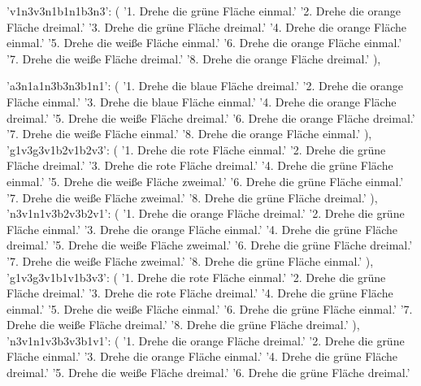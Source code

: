 {{        'v1n3v3n1b1n1b3n3': (
            '1. Drehe die grüne Fläche einmal.\n'
            '2. Drehe die orange Fläche dreimal.\n'
            '3. Drehe die grüne Fläche dreimal.\n'
            '4. Drehe die orange Fläche einmal.\n'
            '5. Drehe die weiße Fläche einmal.\n'
            '6. Drehe die orange Fläche einmal.\n'
            '7. Drehe die weiße Fläche dreimal.\n'
            '8. Drehe die orange Fläche dreimal.'
        ),

        'a3n1a1n3b3n3b1n1': (
            '1. Drehe die blaue Fläche dreimal.\n'
            '2. Drehe die orange Fläche einmal.\n'
            '3. Drehe die blaue Fläche einmal.\n'
            '4. Drehe die orange Fläche dreimal.\n'
            '5. Drehe die weiße Fläche dreimal.\n'
            '6. Drehe die orange Fläche dreimal.\n'
            '7. Drehe die weiße Fläche einmal.\n'
            '8. Drehe die orange Fläche einmal.'
        ),
        'g1v3g3v1b2v1b2v3': (
            '1. Drehe die rote Fläche einmal.\n'
            '2. Drehe die grüne Fläche dreimal.\n'
            '3. Drehe die rote Fläche dreimal.\n'
            '4. Drehe die grüne Fläche einmal.\n'
            '5. Drehe die weiße Fläche zweimal.\n'
            '6. Drehe die grüne Fläche einmal.\n'
            '7. Drehe die weiße Fläche zweimal.\n'
            '8. Drehe die grüne Fläche dreimal.'
        ),
        'n3v1n1v3b2v3b2v1': (
            '1. Drehe die orange Fläche dreimal.\n'
            '2. Drehe die grüne Fläche einmal.\n'
            '3. Drehe die orange Fläche einmal.\n'
            '4. Drehe die grüne Fläche dreimal.\n'
            '5. Drehe die weiße Fläche zweimal.\n'
            '6. Drehe die grüne Fläche dreimal.\n'
            '7. Drehe die weiße Fläche zweimal.\n'
            '8. Drehe die grüne Fläche einmal.'
        ),
        'g1v3g3v1b1v1b3v3': (
            '1. Drehe die rote Fläche einmal.\n'
            '2. Drehe die grüne Fläche dreimal.\n'
            '3. Drehe die rote Fläche dreimal.\n'
            '4. Drehe die grüne Fläche einmal.\n'
            '5. Drehe die weiße Fläche einmal.\n'
            '6. Drehe die grüne Fläche einmal.\n'
            '7. Drehe die weiße Fläche dreimal.\n'
            '8. Drehe die grüne Fläche dreimal.'
        ),
        'n3v1n1v3b3v3b1v1': (
            '1. Drehe die orange Fläche dreimal.\n'
            '2. Drehe die grüne Fläche einmal.\n'
            '3. Drehe die orange Fläche einmal.\n'
            '4. Drehe die grüne Fläche dreimal.\n'
            '5. Drehe die weiße Fläche dreimal.\n'
            '6. Drehe die grüne Fläche dreimal.\n'
}}
